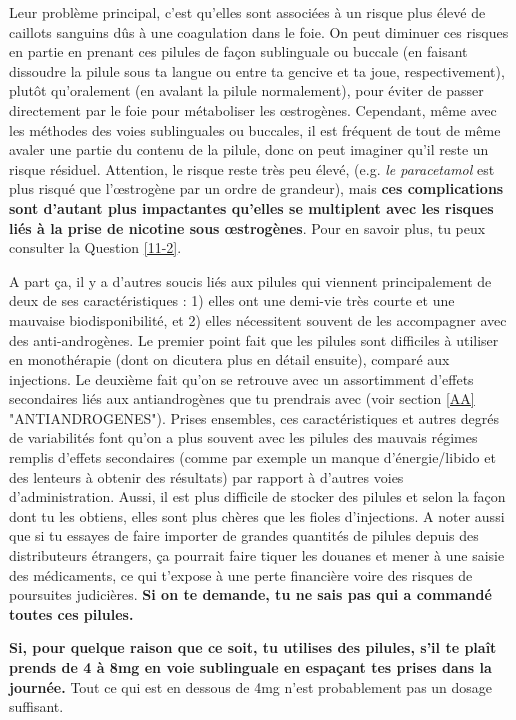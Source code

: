 \documentclass{article}
\begin{document}
Leur problème principal, c'est qu'elles sont associées à un risque plus élevé de caillots sanguins dûs à une coagulation dans le foie. On peut diminuer ces risques en partie en prenant ces pilules de façon sublinguale ou buccale (en faisant dissoudre la pilule sous ta langue ou entre ta gencive et ta joue, respectivement), plutôt qu'oralement (en avalant la pilule normalement), pour éviter de passer directement par le foie pour métaboliser les œstrogènes. Cependant, même avec les méthodes des voies sublinguales ou buccales, il est fréquent de tout de même avaler une partie du contenu de la pilule, donc on peut imaginer qu'il reste un risque résiduel. Attention, le risque reste très peu élevé, (e.g. \textit{le paracetamol} est plus risqué que l'œstrogène par un ordre de grandeur), mais \textbf{ces complications sont d'autant plus impactantes qu'elles se multiplent avec les risques liés à la prise de nicotine sous œstrogènes}. Pour en savoir plus, tu peux consulter la Question \ref{11-2}.

A part ça, il y a d'autres soucis liés aux pilules qui viennent principalement de deux de ses caractéristiques : 1) elles ont une demi-vie très courte et une mauvaise biodisponibilité, et 2) elles nécessitent souvent de les accompagner avec des anti-androgènes. Le premier point fait que les pilules sont difficiles à utiliser en monothérapie (dont on dicutera plus en détail ensuite), comparé aux injections. Le deuxième fait qu'on se retrouve avec un assortimment d'effets secondaires liés aux antiandrogènes que tu prendrais avec (voir section \ref{AA} "ANTIANDROGENES"). Prises ensembles, ces caractéristiques et autres degrés de variabilités font qu'on a plus souvent avec les pilules des mauvais régimes remplis d'effets secondaires (comme par exemple un manque d'énergie/libido et des lenteurs à obtenir des résultats) par rapport à d'autres voies d'administration. Aussi, il est plus difficile de stocker des pilules et selon la façon dont tu les obtiens, elles sont plus chères que les fioles d'injections. A noter aussi que si tu essayes de faire importer de grandes quantités de pilules depuis des distributeurs étrangers, ça pourrait faire tiquer les douanes et mener à une saisie des médicaments, ce qui t'expose à une perte financière voire des risques de poursuites judicières. \textbf{Si on te demande, tu ne sais pas qui a commandé toutes ces pilules.}

\textbf{Si, pour quelque raison que ce soit, tu utilises des pilules, s'il te plaît prends de 4 à 8mg en voie sublinguale en espaçant tes prises dans la journée.} Tout ce qui est en dessous de 4mg n'est probablement pas un dosage suffisant.
\end{document}
